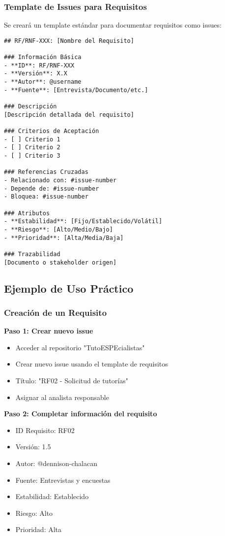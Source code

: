 \documentclass[12pt,a4paper]{article}
\begin{document}
\subsubsection{Template de Issues para Requisitos}

Se creará un template estándar para documentar requisitos como issues:

\begin{verbatim}
## RF/RNF-XXX: [Nombre del Requisito]

### Información Básica
- **ID**: RF/RNF-XXX
- **Versión**: X.X
- **Autor**: @username
- **Fuente**: [Entrevista/Documento/etc.]

### Descripción
[Descripción detallada del requisito]

### Criterios de Aceptación
- [ ] Criterio 1
- [ ] Criterio 2
- [ ] Criterio 3

### Referencias Cruzadas
- Relacionado con: #issue-number
- Depende de: #issue-number
- Bloquea: #issue-number

### Atributos
- **Estabilidad**: [Fijo/Establecido/Volátil]
- **Riesgo**: [Alto/Medio/Bajo]
- **Prioridad**: [Alta/Media/Baja]

### Trazabilidad
[Documento o stakeholder origen]
\end{verbatim}

\subsection{Ejemplo de Uso Práctico}

\subsubsection{Creación de un Requisito}

\textbf{Paso 1: Crear nuevo issue}
\begin{itemize}
    \item Acceder al repositorio "TutoESPEcialistas"
    \item Crear nuevo issue usando el template de requisitos
    \item Título: "RF02 - Solicitud de tutorías"
    \item Asignar al analista responsable
\end{itemize}

\textbf{Paso 2: Completar información del requisito}
\begin{itemize}
    \item ID Requisito: RF02
    \item Versión: 1.5
    \item Autor: @dennison-chalacan
    \item Fuente: Entrevistas y encuestas
    \item Estabilidad: Establecido
    \item Riesgo: Alto
    \item Prioridad: Alta
\end{itemize}
\end{document}
